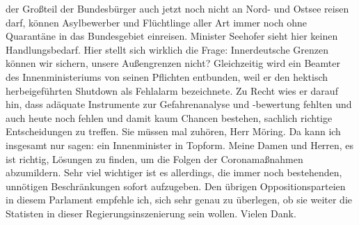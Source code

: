 \documentclass{article}
\begin{document}
der Großteil der Bundesbürger auch jetzt noch nicht an Nord- und Ostsee reisen darf, können Asylbewerber und Flüchtlinge aller Art  immer noch ohne Quarantäne in das Bundesgebiet einreisen. Minister Seehofer sieht hier keinen Handlungsbedarf. Hier stellt sich wirklich die Frage: Innerdeutsche Grenzen können wir sichern, unsere Außengrenzen nicht?  Gleichzeitig wird ein Beamter des Innenministeriums von seinen Pflichten entbunden, weil er den hektisch herbeigeführten Shutdown als Fehlalarm bezeichnete.  Zu Recht wies er darauf hin, dass adäquate Instrumente zur Gefahrenanalyse und ‑bewertung fehlten und auch heute noch fehlen und damit kaum Chancen bestehen, sachlich richtige Entscheidungen zu treffen. Sie müssen mal zuhören, Herr Möring.  Da kann ich insgesamt nur sagen: ein Innenminister in Topform. Meine Damen und Herren, es ist richtig, Lösungen zu finden, um die Folgen der Coronamaßnahmen abzumildern. Sehr viel wichtiger ist es allerdings, die immer noch bestehenden, unnötigen Beschränkungen sofort aufzugeben.  Den übrigen Oppositionsparteien in diesem Parlament empfehle ich, sich sehr genau zu überlegen, ob sie weiter die Statisten in dieser Regierungsinszenierung sein wollen. Vielen Dank.  
\end{document}
